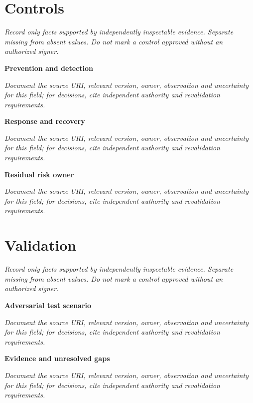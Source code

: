 \documentclass[11pt,letterpaper]{article}
\begin{document}
\section{Controls}
\noindent\emph{Record only facts supported by independently inspectable evidence. Separate missing from absent values. Do not mark a control approved without an authorized signer.}\par
\noindent\textbf{Prevention and detection}\par
\noindent\emph{Document the source URI, relevant version, owner, observation and uncertainty for this field; for decisions, cite independent authority and revalidation requirements.}\par\medskip
\noindent\textbf{Response and recovery}\par
\noindent\emph{Document the source URI, relevant version, owner, observation and uncertainty for this field; for decisions, cite independent authority and revalidation requirements.}\par\medskip
\noindent\textbf{Residual risk owner}\par
\noindent\emph{Document the source URI, relevant version, owner, observation and uncertainty for this field; for decisions, cite independent authority and revalidation requirements.}\par\medskip
\section{Validation}
\noindent\emph{Record only facts supported by independently inspectable evidence. Separate missing from absent values. Do not mark a control approved without an authorized signer.}\par
\noindent\textbf{Adversarial test scenario}\par
\noindent\emph{Document the source URI, relevant version, owner, observation and uncertainty for this field; for decisions, cite independent authority and revalidation requirements.}\par\medskip
\noindent\textbf{Evidence and unresolved gaps}\par
\noindent\emph{Document the source URI, relevant version, owner, observation and uncertainty for this field; for decisions, cite independent authority and revalidation requirements.}\par\medskip
\end{document}
